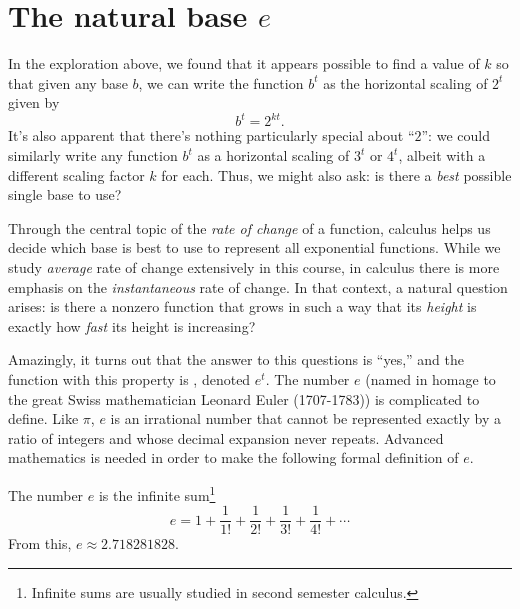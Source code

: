 \documentclass[nooutcomes]{ximera}
\begin{document}

\section{The natural base \(e\)}

In the exploration above, we found that it appears possible to find a value of \(k\) so that given any base \(b\), we can write the function \(b^t\) as the horizontal scaling of \(2^t\) given by%
\begin{equation*}
b^t = 2^{kt}\text{.}
\end{equation*}
It's also apparent that there's nothing particularly special about ``\(2\)'': we could similarly write any function \(b^t\) as a horizontal scaling of \(3^t\) or \(4^t\), albeit with a different scaling factor \(k\) for each.  Thus, we might also ask:  is there a \emph{best} possible single base to use?

Through the central topic of the \emph{rate of change} of a function, calculus helps us decide which base is best to use to represent all exponential functions.  While we study \emph{average} rate of change extensively in this course, in calculus there is more emphasis on the \emph{instantaneous} rate of change.  In that context, a natural question arises: is there a nonzero function that grows in such a way that its \emph{height} is exactly how \emph{fast} its height is increasing?

Amazingly, it turns out that the answer to this questions is ``yes,'' and the function with this property is , denoted \(e^t\). The number \(e\) (named in homage to the great Swiss mathematician Leonard Euler (1707-1783)) is complicated to define.  Like \(\pi\), \(e\) is an irrational number that cannot be represented exactly by a ratio of integers and whose decimal expansion never repeats.  Advanced mathematics is needed in order to make the following formal definition of \(e\).%

\begin{definition}
The number \(e\) is the infinite sum\footnote{Infinite sums are usually studied in second semester calculus.\label{fn-28}}%
\begin{equation*}
e = 1 + \frac{1}{1!} + \frac{1}{2!} + \frac{1}{3!} + \frac{1}{4!} + \cdots
\end{equation*}
From this, \(e \approx 2.718281828\).%
\end{definition}
\end{document}
